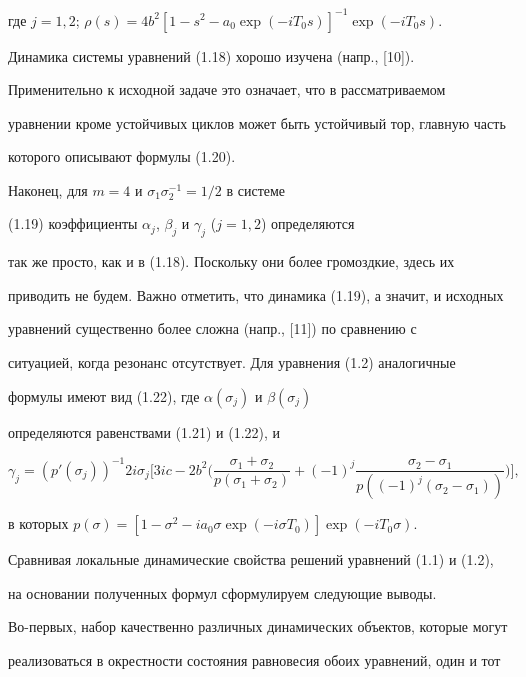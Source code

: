 где $j=1,2$; $\rho(s)=4b^2[1-s^2-a_0\exp(-iT_0s)]^{-1}\exp(-iT_0s)$.


Динамика системы уравнений (1.18) хорошо изучена (напр., [10]).


Применительно к исходной задаче это означает, что в рассматриваемом


уравнении кроме устойчивых циклов может быть устойчивый тор, главную часть


которого описывают формулы (1.20).





Наконец, для $m=4$ и $\sigma_1 \sigma_2^{-1} = 1/2$ в системе


(1.19) коэффициенты $\alpha_j$, $\beta_j$ и $\gamma_j$ ($j=1,2$) определяются


так же просто, как и в (1.18). Поскольку они более громоздкие, здесь их


приводить не будем. Важно отметить, что динамика (1.19), а значит, и исходных


уравнений существенно более сложна (напр., [11]) по сравнению с


ситуацией, когда резонанс отсутствует. Для уравнения (1.2) аналогичные


формулы имеют вид (1.22), где $\alpha(\sigma_j)$ и $\beta(\sigma_j)$


определяются равенствами (1.21) и (1.22), и


$$


\gamma_j = (p'(\sigma_j))^{-1}2i\sigma_j


\bigg[3ic-2b^2\bigg(\frac{\sigma_1+\sigma_2}{p(\sigma_1+\sigma_2)} +


(-1)^j\frac{\sigma_2-\sigma_1}{p((-1)^j(\sigma_2-\sigma_1))}\bigg)


\bigg],


$$


в которых $p(\sigma)=[1-\sigma^2-ia_0\sigma\exp(-i\sigma T_0)]


\exp(-iT_0\sigma)$.





Сравнивая локальные динамические свойства решений уравнений (1.1) и (1.2),


на основании полученных формул сформулируем следующие выводы.


Во-первых, набор качественно различных динамических объектов, которые могут


реализоваться в окрестности состояния равновесия обоих уравнений, один и тот


